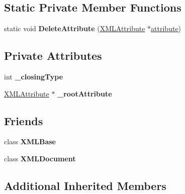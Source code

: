 \subsection*{Static Private Member Functions}
\begin{DoxyCompactItemize}
\item 
\hypertarget{classtinyxml2_1_1_x_m_l_element_af6af63c153c343cc71638375c4a2085d}{}static void {\bfseries Delete\+Attribute} (\hyperlink{classtinyxml2_1_1_x_m_l_attribute}{X\+M\+L\+Attribute} $\ast$\hyperlink{_xml_write_8hpp_a4a687c3f177b66efa50586999b8a3172}{attribute})\label{classtinyxml2_1_1_x_m_l_element_af6af63c153c343cc71638375c4a2085d}

\end{DoxyCompactItemize}
\subsection*{Private Attributes}
\begin{DoxyCompactItemize}
\item 
\hypertarget{classtinyxml2_1_1_x_m_l_element_ad6dbc2ecd157801ddc9bba7c3572796b}{}int {\bfseries \+\_\+closing\+Type}\label{classtinyxml2_1_1_x_m_l_element_ad6dbc2ecd157801ddc9bba7c3572796b}

\item 
\hypertarget{classtinyxml2_1_1_x_m_l_element_ad067115a9f42b2df1fcdf3e0355f2789}{}\hyperlink{classtinyxml2_1_1_x_m_l_attribute}{X\+M\+L\+Attribute} $\ast$ {\bfseries \+\_\+root\+Attribute}\label{classtinyxml2_1_1_x_m_l_element_ad067115a9f42b2df1fcdf3e0355f2789}

\end{DoxyCompactItemize}
\subsection*{Friends}
\begin{DoxyCompactItemize}
\item 
\hypertarget{classtinyxml2_1_1_x_m_l_element_a449202cfc89e7ae5c2f81995476f9ec1}{}class {\bfseries X\+M\+L\+Base}\label{classtinyxml2_1_1_x_m_l_element_a449202cfc89e7ae5c2f81995476f9ec1}

\item 
\hypertarget{classtinyxml2_1_1_x_m_l_element_a4eee3bda60c60a30e4e8cd4ea91c4c6e}{}class {\bfseries X\+M\+L\+Document}\label{classtinyxml2_1_1_x_m_l_element_a4eee3bda60c60a30e4e8cd4ea91c4c6e}

\end{DoxyCompactItemize}
\subsection*{Additional Inherited Members}


